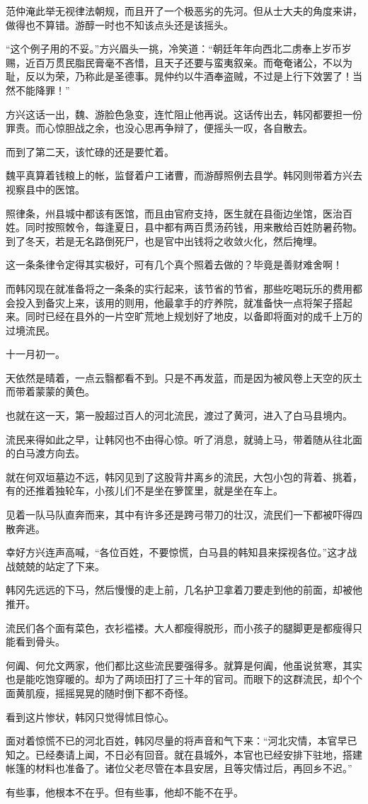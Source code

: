 范仲淹此举无视律法朝规，而且开了一个极恶劣的先河。但从士大夫的角度来讲，做得也不算错。游醇一时也不知该点头还是该摇头。

“这个例子用的不妥。”方兴眉头一挑，冷笑道：“朝廷年年向西北二虏奉上岁币岁赐，近百万贯民脂民膏毫不吝惜，且天子还要与蛮夷叙亲。而奄奄诸公，不以为耻，反以为荣，乃称此是圣德事。晁仲约以牛酒奉盗贼，不过是上行下效罢了！当然不能降罪！”

方兴这话一出，魏、游脸色急变，连忙阻止他再说。这话传出去，韩冈都要担一份罪责。而心惊胆战之余，也没心思再争辩了，便摇头一叹，各自散去。

而到了第二天，该忙碌的还是要忙着。

魏平真算着钱粮上的帐，监督着户工诸曹，而游醇照例去县学。韩冈则带着方兴去视察县中的医馆。

照律条，州县城中都该有医馆，而且由官府支持，医生就在县衙边坐馆，医治百姓。同时按照敇令，每逢夏日，县中都有两百贯汤药钱，用来散给百姓防暑药物。到了冬天，若是无名路倒死尸，也是官中出钱将之收敛火化，然后掩埋。

这一条条律令定得其实极好，可有几个真个照着去做的？毕竟是善财难舍啊！

而韩冈现在就准备将之一条条的实行起来，该节省的节省，那些吃喝玩乐的费用都会投入到备灾上来，该用的则用，他最拿手的疗养院，就准备快一点将架子搭起来。同时已经在县外的一片空旷荒地上规划好了地皮，以备即将面对的成千上万的过境流民。

十一月初一。

天依然是晴着，一点云翳都看不到。只是不再发蓝，而是因为被风卷上天空的灰土而带着蒙蒙的黄色。

也就在这一天，第一股超过百人的河北流民，渡过了黄河，进入了白马县境内。

流民来得如此之早，让韩冈也不由得心惊。听了消息，就骑上马，带着随从往北面的白马渡方向去。

就在何双垣墓边不远，韩冈见到了这股背井离乡的流民，大包小包的背着、挑着，有的还推着独轮车，小孩儿们不是坐在箩筐里，就是坐在车上。

见着一队马队直奔而来，其中有许多还是跨弓带刀的壮汉，流民们一下都被吓得四散奔逃。

幸好方兴连声高喊，“各位百姓，不要惊慌，白马县的韩知县来探视各位。”这才战战兢兢的站定了下来。

韩冈先远远的下马，然后慢慢的走上前，几名护卫拿着刀要走到他的前面，却被他推开。

流民们各个面有菜色，衣衫褴褛。大人都瘦得脱形，而小孩子的腿脚更是都瘦得只能看到骨头。

何阗、何允文两家，他们都比这些流民要强得多。就算是何阗，他虽说贫寒，其实也是能吃饱穿暖的。却为了两顷田打了三十年的官司。而眼下的这群流民，却个个面黄肌瘦，摇摇晃晃的随时倒下都不奇怪。

看到这片惨状，韩冈只觉得怵目惊心。

面对着惊慌不已的河北百姓，韩冈尽量的将声音和气下来：“河北灾情，本官早已知之。已经奏请上闻，不日必有回音。就在县城外，本官也已经安排下驻地，搭建帐篷的材料也准备了。诸位父老尽管在本县安居，且等灾情过后，再回乡不迟。”

有些事，他根本不在乎。但有些事，他却不能不在乎。


